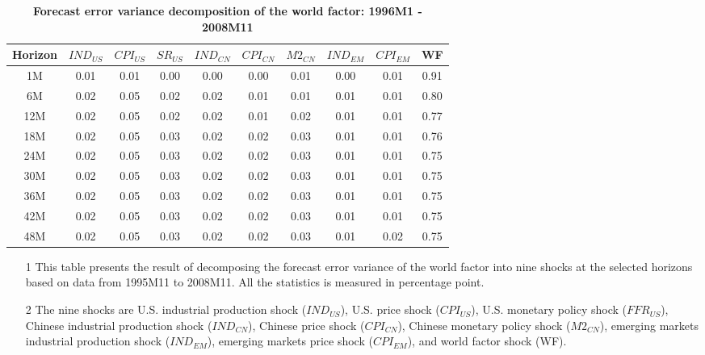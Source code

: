 \documentclass[12pt]{article}
\numberwithin{equation}{section}
\begin{document}
\begin{table}[htbp]
  \centering
\caption{\textbf{Forecast error variance decomposition of the world factor: 1996M1 - 2008M11}}
   \begin{tabularx}{\textwidth}{@{\extracolsep{\fill}}cccccccccc}
    \hline\hline
\multirow{1}{0.9cm}{Horizon}	&	\multirow{1}{0.9cm}{$IND_{US}$}	&	\multirow{1}{0.9cm}{$CPI_{US}$}	&	\multirow{1}{0.9cm}{$SR_{US}$}	&	\multirow{1}{0.9cm}{$IND_{CN}$}	&	\multirow{1}{0.9cm}{$CPI_{CN}$}	&	\multirow{1}{0.9cm}{$M2_{CN}$}	&	\multirow{1}{0.9cm}{$IND_{EM}$}	&	\multirow{1}{0.9cm}{$CPI_{EM}$}	&	\multirow{1}{0.9cm}{WF}	\\\hline
1M	&	0.01 	&	0.01 	&	0.00 	&	0.00 	&	0.00 	&	0.01 	&	0.00 	&	0.01 	&	0.91 	\\
6M	&	0.02 	&	0.05 	&	0.02 	&	0.02 	&	0.01 	&	0.01 	&	0.01 	&	0.01 	&	0.80 	\\
12M	&	0.02 	&	0.05 	&	0.02 	&	0.02 	&	0.01 	&	0.02 	&	0.01 	&	0.01 	&	0.77 	\\
18M	&	0.02 	&	0.05 	&	0.03 	&	0.02 	&	0.02 	&	0.03 	&	0.01 	&	0.01 	&	0.76 	\\
24M	&	0.02 	&	0.05 	&	0.03 	&	0.02 	&	0.02 	&	0.03 	&	0.01 	&	0.01 	&	0.75 	\\
30M	&	0.02 	&	0.05 	&	0.03 	&	0.02 	&	0.02 	&	0.03 	&	0.01 	&	0.01 	&	0.75 	\\
36M	&	0.02 	&	0.05 	&	0.03 	&	0.02 	&	0.02 	&	0.03 	&	0.01 	&	0.01 	&	0.75 	\\
42M	&	0.02 	&	0.05 	&	0.03 	&	0.02 	&	0.02 	&	0.03 	&	0.01 	&	0.01 	&	0.75 	\\
48M	&	0.02 	&	0.05 	&	0.03 	&	0.02 	&	0.02 	&	0.03 	&	0.01 	&	0.02 	&	0.75 	\\
\hline\hline
    \end{tabularx}%
  \label{tab:vd_before}%

  \begin{minipage}{\textwidth}
{			
    \begin{itemize}
\item[1] This table presents the result of decomposing the forecast error variance of the world factor into nine shocks at the selected horizons based on data from 1995M11 to 2008M11. All the statistics is measured in percentage point.
\item[2] The nine shocks are U.S. industrial production shock ($IND_{US}$), U.S. price shock ($CPI_{US}$), U.S. monetary policy shock ($FFR_{US}$), Chinese industrial production shock ($IND_{CN}$), Chinese price shock ($CPI_{CN}$), Chinese monetary policy shock ($M2_{CN}$), emerging markets industrial production shock ($IND_{EM}$), emerging markets price shock ($CPI_{EM}$), and world factor shock (WF).
\end{itemize}
}
\end{minipage}

\end{table}%
\end{document}
